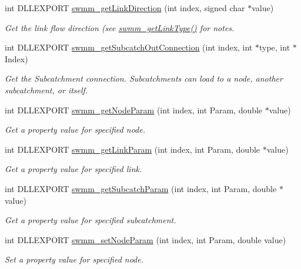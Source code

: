\begin{DoxyCompactItemize}
int D\+L\+L\+E\+X\+P\+O\+RT \hyperlink{group___network_info_gac390c83be7f7f0e2cd9c6f1126a226aa}{swmm\+\_\+get\+Link\+Direction} (int index, signed char $\ast$value)
\begin{DoxyCompactList}\small\item\em Get the link flow direction (see \hyperlink{group___network_info_gacf4d0ca8a3ced3c1b8797f3f09fff1d0}{swmm\+\_\+get\+Link\+Type()} for notes. \end{DoxyCompactList}\item 
int D\+L\+L\+E\+X\+P\+O\+RT \hyperlink{group___network_info_ga680f272c435f20efed35fd2725be4a08}{swmm\+\_\+get\+Subcatch\+Out\+Connection} (int index, int $\ast$type, int $\ast$Index)
\begin{DoxyCompactList}\small\item\em Get the Subcatchment connection. Subcatchments can load to a node, another subcatchment, or itself. \end{DoxyCompactList}\item 
int D\+L\+L\+E\+X\+P\+O\+RT \hyperlink{group___network_info_ga90d0d4c48e2cbeaea1bd43ba095a6672}{swmm\+\_\+get\+Node\+Param} (int index, int Param, double $\ast$value)
\begin{DoxyCompactList}\small\item\em Get a property value for specified node. \end{DoxyCompactList}\item 
int D\+L\+L\+E\+X\+P\+O\+RT \hyperlink{group___network_info_gaab21d9f5a8789ab41c981a90e1240cc5}{swmm\+\_\+get\+Link\+Param} (int index, int Param, double $\ast$value)
\begin{DoxyCompactList}\small\item\em Get a property value for specified link. \end{DoxyCompactList}\item 
int D\+L\+L\+E\+X\+P\+O\+RT \hyperlink{group___network_info_ga20fcc911e1b6dbf4393a8e404d840963}{swmm\+\_\+get\+Subcatch\+Param} (int index, int Param, double $\ast$value)
\begin{DoxyCompactList}\small\item\em Get a property value for specified subcatchment. \end{DoxyCompactList}\item 
int D\+L\+L\+E\+X\+P\+O\+RT \hyperlink{group___network_info_gaa0bc371349ae8f593722e0c3bb0abf31}{swmm\+\_\+set\+Node\+Param} (int index, int Param, double value)
\begin{DoxyCompactList}\small\item\em Set a property value for specified node. \end{DoxyCompactList}\item 

\end{DoxyCompactItemize}
